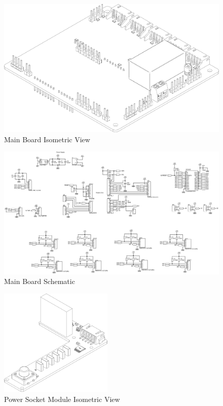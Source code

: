 \documentclass[conference, a4paper]{IEEEtran}
\begin{document}
\begin{figure}[tbh]
  \centering
  \includegraphics[width=\textwidth]{img/argonarc_wireframe.png}
  \caption{Main Board Isometric View}
  \label{fig:main_board}
\end{figure}


\begin{figure}[tbh]
  \centering
  \includegraphics[width=1.4\textwidth,angle=90]{img/board_schematic.png}
  \caption{Main Board Schematic}
  \label{fig:board_schematic}
\end{figure}

\begin{figure}[tbh]
  \centering
  \includegraphics[width=0.48\textwidth]{img/uargonarc_wireframe.png}
  \caption{Power Socket Module Isometric View}
  \label{fig:socket_module}
\end{figure}
\end{document}
